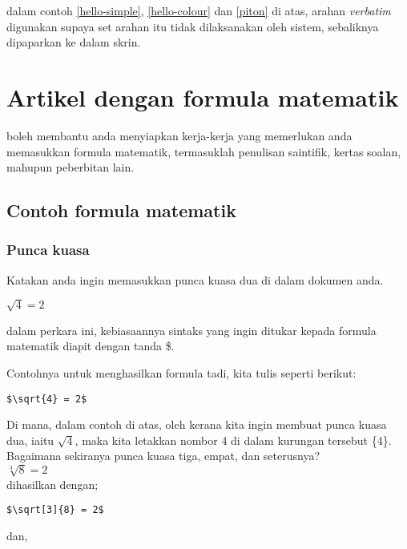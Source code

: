 dalam contoh \ref{hello-simple}, \ref{hello-colour} dan \ref{piton} di atas, arahan \emph{verbatim} digunakan supaya set arahan itu tidak dilaksanakan oleh sistem, 
sebaliknya dipaparkan ke dalam skrin.

\section{Artikel dengan formula matematik}
\latex{} boleh membantu anda menyiapkan kerja-kerja yang memerlukan anda memasukkan formula matematik, termasuklah penulisan saintifik, kertas soalan, mahupun peberbitan lain. 



\subsection{Contoh formula matematik}

\subsubsection{Punca kuasa}
Katakan anda ingin memasukkan punca kuasa dua di dalam dokumen anda.

$\sqrt{4} = 2$

dalam perkara ini, kebiasaannya sintaks yang ingin ditukar kepada formula matematik diapit dengan tanda \mbox{\$}.

Contohnya untuk menghasilkan formula tadi, kita tulis seperti berikut:\\

\begin{Verbatim}[frame=single]
 $\sqrt{4} = 2$
\end{Verbatim}

Di mana, dalam contoh di atas, oleh kerana kita ingin membuat punca kuasa dua, iaitu $\sqrt{4}$, maka kita letakkan nombor 4 di dalam kurungan tersebut \mbox{\{4\}}.
Bagaimana sekiranya punca kuasa tiga, empat, dan seterusnya?\\

$\sqrt[3]{8} = 2$\\

dihasilkan dengan;\\

\begin{Verbatim}[frame=single]
 $\sqrt[3]{8} = 2$
\end{Verbatim}

dan,\\

